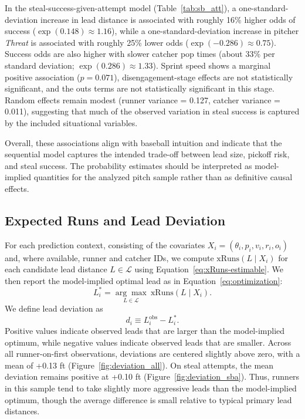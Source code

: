 \documentclass[12pt,letterpaper]{article}
\begin{document}
In the steal-success-given-attempt model (Table~\ref{tab:sb_att}), a one-standard-deviation increase in lead distance is associated with roughly 16\% higher odds of success ($\exp(0.148)\approx1.16$), while a one-standard-deviation increase in pitcher \emph{Threat} is associated with roughly 25\% lower odds ($\exp(-0.286)\approx0.75$). Success odds are also higher with slower catcher pop times (about 33\% per standard deviation; $\exp(0.286)\approx1.33$). Sprint speed shows a marginal positive association ($p=0.071$), disengagement-stage effects are not statistically significant, and the outs terms are not statistically significant in this stage. Random effects remain modest (runner variance = 0.127, catcher variance = 0.011), suggesting that much of the observed variation in steal success is captured by the included situational variables.

Overall, these associations align with baseball intuition and indicate that the sequential model captures the intended trade-off between lead size, pickoff risk, and steal success. The probability estimates should be interpreted as model-implied quantities for the analyzed pitch sample rather than as definitive causal effects.

\subsection{Expected Runs and Lead Deviation}

For each prediction context, consisting of the covariates $X_i=(\theta_i,p_i,v_i,r_i,o_i)$ and, where available, runner and catcher IDs, we compute $\mathrm{xRuns}(L\mid X_i)$ for each candidate lead distance $L\in\mathcal{L}$ using Equation~\ref{eq:xRuns-estimable}. We then report the model-implied optimal lead as in Equation~\ref{eq:optimization}:
\[
    L_i^* = \underset{L\in\mathcal{L}}{\arg\max}\ \mathrm{xRuns}(L\mid X_i).
\]
We define lead deviation as
\begin{equation}
    d_i \equiv L_i^{\mathrm{obs}} - L_i^*. \label{eq:deviation}
\end{equation}
Positive values indicate observed leads that are larger than the model-implied optimum, while negative values indicate observed leads that are smaller. Across all runner-on-first observations, deviations are centered slightly above zero, with a mean of +0.13 ft (Figure~\ref{fig:deviation_all}). On steal attempts, the mean deviation remains positive at +0.10 ft (Figure~\ref{fig:deviation_sba}). Thus, runners in this sample tend to take slightly more aggressive leads than the model-implied optimum, though the average difference is small relative to typical primary lead distances.
\end{document}
